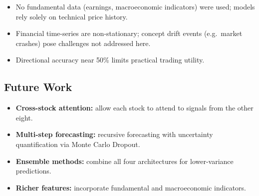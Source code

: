 \documentclass[12pt, a4paper]{article}
\begin{document}
\begin{itemize}
  \item No fundamental data (earnings, macroeconomic indicators) were used; models rely solely on technical price history.
  \item Financial time-series are non-stationary; concept drift events (e.g.\ market crashes) pose challenges not addressed here.
  \item Directional accuracy near 50\% limits practical trading utility.
\end{itemize}

\subsection{Future Work}

\begin{itemize}
  \item \textbf{Cross-stock attention:} allow each stock to attend to signals from the other eight.
  \item \textbf{Multi-step forecasting:} recursive forecasting with uncertainty quantification via Monte Carlo Dropout.
  \item \textbf{Ensemble methods:} combine all four architectures for lower-variance predictions.
  \item \textbf{Richer features:} incorporate fundamental and macroeconomic indicators.
\end{itemize}
\end{document}
